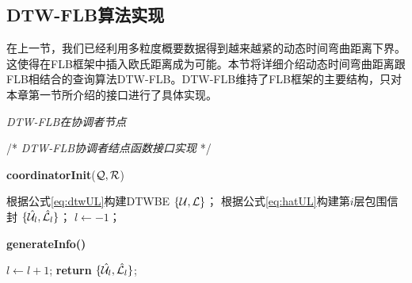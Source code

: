\subsection{DTW-FLB算法实现}
在上一节，我们已经利用多粒度概要数据得到越来越紧的动态时间弯曲距离下界。这使得在FLB框架中插入欧氏距离成为可能。本节将详细介绍动态时间弯曲距离跟FLB相结合的查询算法DTW-FLB。DTW-FLB维持了FLB框架的主要结构，只对本章第一节所介绍的接口进行了具体实现。

\begin{algorithm}[t]
	\renewcommand{\baselinestretch}{1}
	\caption{{\sl DTW-FLB在协调者节点} \label{alg:DTWCor}}
	\begin{algorithmic}[2]
		\STATE /* \emph{DTW-FLB协调者结点函数接口实现} */
	\end{algorithmic}
	\textbf{coordinatorInit}(${\cal Q}, {\cal R}$)
	\begin{algorithmic}[1]
		\STATE 根据公式\ref{eq:dtwUL}构建DTWBE $\{{\cal U},{\cal L}\}$；
			 \STATE 根据公式\ref{eq:hatUL}构建第$i$层包围信封 $ \{\hat{{\cal U}_{l}}, \hat{{\cal L}_{l}}\}$；
		\ENDFOR 
		\STATE $l\leftarrow -1$；
	\end{algorithmic}
	\textbf{generateInfo()}
	\begin{algorithmic}[1]
		\STATE $l\leftarrow l+1$; 
		\STATE \textbf{return} $ \{\hat{{\cal U}_{l}}, \hat{{\cal L}_{l}}\}$;
	\end{algorithmic}
\end{algorithm}

